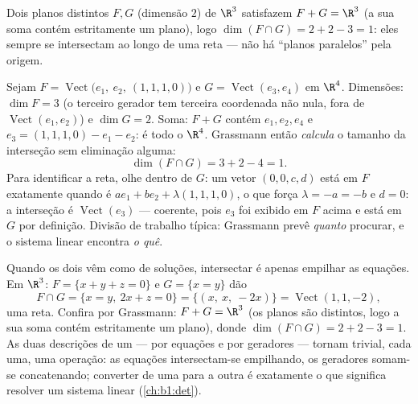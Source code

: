 \begin{example}\label{ex:b1:findim:planes}
Dois planos distintos $F, G$ (dimensão $2$) de $\R^3$ satisfazem
$F + G
= \R^3$ (a sua soma contém estritamente um plano), logo $\dim(F \cap G) =
2 + 2 - 3 = 1$: eles
sempre se intersectam ao longo de uma reta --- não há ``planos
paralelos'' pela origem.
\end{example}

\begin{example}
\label{ex:b1:findim:grassmannrun}
Sejam $F = \operatorname{Vect}\bigl(e_1,\ e_2,\ (1,1,1,0)\bigr)$ e $G = \operatorname{Vect}(e_3, e_4)$ em $\R^4$. Dimensões: $\dim F = 3$ (o terceiro gerador
tem terceira coordenada não nula, fora de $\operatorname{Vect}(e_1, e_2)$) e $\dim G = 2$. Soma:
$F + G$ contém $e_1, e_2, e_4$ e $e_3 = (1,1,1,0) - e_1 -
e_2$: é todo o $\R^4$. Grassmann então
\emph{calcula} o tamanho da interseção sem eliminação alguma:
\[
\dim(F \cap G) = 3 + 2 - 4 = 1 .
\]
Para identificar a reta, olhe dentro de $G$: um vetor $(0, 0, c, d)$ está em
$F$ exatamente quando é $a e_1 + b e_2 + \lambda(1,1,1,0)$, o que força $\lambda = -a = -b$ e $d = 0$: a
interseção é $\operatorname{Vect}(e_3)$ --- coerente, pois $e_3$ foi exibido em $F$
acima e está em $G$ por definição. Divisão de trabalho típica:
Grassmann prevê \emph{quanto} procurar, e o sistema linear encontra
\emph{o quê}.
\end{example}

\begin{example}
\label{ex:b1:findim:intersectequations}
Quando os dois  vêm como  de soluções,
intersectar é apenas empilhar as equações. Em $\R^3$: $F = \{x + y + z = 0\}$ e
$G = \{x = y\}$ dão
\[
F \cap G = \{x = y,\ 2x + z = 0\}
= \{(x,\ x,\ -2x)\} = \operatorname{Vect}(1, 1, -2),
\]
uma reta. Confira por Grassmann: $F + G = \R^3$ (os planos são distintos,
logo a sua soma contém estritamente um plano), donde $\dim(F\cap G) = 2 + 2 - 3 = 1$. As duas
descrições de um  --- por equações e por geradores ---
tornam trivial, cada uma, uma operação: as equações intersectam-se
empilhando, os geradores somam-se concatenando; converter de uma
para a outra é exatamente o que significa resolver um sistema
linear (\cref{ch:b1:det}).
\end{example}


